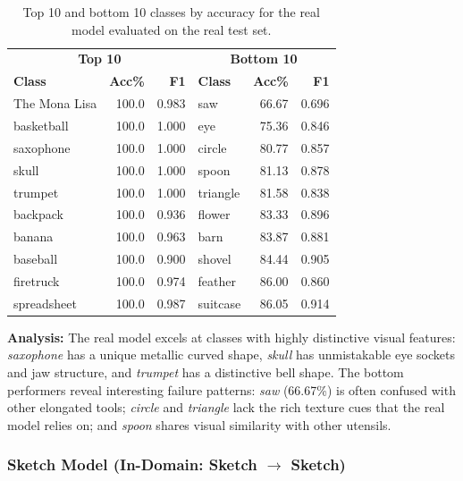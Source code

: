 \documentclass[12pt, a4paper]{article}
\begin{document}
\begin{table}[H]
\centering
\caption{Top 10 and bottom 10 classes by accuracy for the real model evaluated
on the real test set.}
\label{tab:top_bottom_real}
\begin{tabular}{lrr|lrr}
\toprule
\multicolumn{3}{c|}{\textbf{Top 10}} & \multicolumn{3}{c}{\textbf{Bottom 10}} \\
\textbf{Class} & \textbf{Acc\%} & \textbf{F1} &
\textbf{Class} & \textbf{Acc\%} & \textbf{F1} \\
\midrule
The Mona Lisa     & 100.0 & 0.983 & saw        & 66.67 & 0.696 \\
basketball        & 100.0 & 1.000 & eye        & 75.36 & 0.846 \\
saxophone         & 100.0 & 1.000 & circle     & 80.77 & 0.857 \\
skull              & 100.0 & 1.000 & spoon      & 81.13 & 0.878 \\
trumpet           & 100.0 & 1.000 & triangle   & 81.58 & 0.838 \\
backpack          & 100.0 & 0.936 & flower     & 83.33 & 0.896 \\
banana            & 100.0 & 0.963 & barn       & 83.87 & 0.881 \\
baseball          & 100.0 & 0.900 & shovel     & 84.44 & 0.905 \\
firetruck         & 100.0 & 0.974 & feather    & 86.00 & 0.860 \\
spreadsheet       & 100.0 & 0.987 & suitcase   & 86.05 & 0.914 \\
\bottomrule
\end{tabular}
\end{table}

\textbf{Analysis:} The real model excels at classes with highly distinctive
visual features: \emph{saxophone} has a unique metallic curved shape,
\emph{skull} has unmistakable eye sockets and jaw structure, and \emph{trumpet}
has a distinctive bell shape.  The bottom performers reveal interesting failure
patterns: \emph{saw} (66.67\%) is often confused with other elongated tools;
\emph{circle} and \emph{triangle} lack the rich texture cues that the
real model relies on; and \emph{spoon} shares visual similarity with other
utensils.

\subsubsection{Sketch Model (In-Domain: Sketch $\to$ Sketch)}
\end{document}
